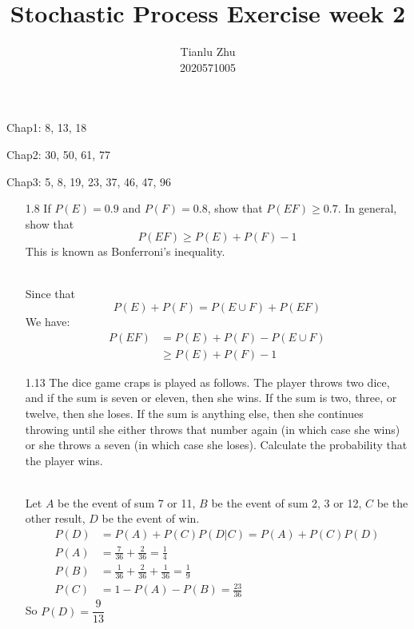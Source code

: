 \documentclass[en,hazy,blue,12pt,device = normal]{elegantnote}
\title{Stochastic Process Exercise week 2}
\author{Tianlu Zhu \\ 2020571005}
\date{}
\begin{document}
\maketitle
Chap1: 8, 13, 18

   Chap2: 30, 50, 61, 77

   Chap3: 5, 8, 19, 23, 37, 46, 47, 96

\begin{enumerate}
    \item[1.8] If $P(E)=0.9$ and $P(F)=0.8$, show that $P(E F) \geq 0.7$. In general, show that
    $$
    P(E F) \geq P(E)+P(F)-1
    $$
    This is known as Bonferroni's inequality.
    \begin{tcolorbox}
        \sol\\
        Since that \[P(E) + P(F) = P(E\cup F) + P(EF)\]
        We have:
        \begin{align*}
            P(EF)&=P(E) + P(F) - P(E\cup F)\\
            &\geq P(E) + P(F) - 1
        \end{align*}
    \end{tcolorbox}

    \item[1.13] The dice game craps is played as follows. The player throws two dice, and if the sum is seven or eleven, then she wins. If the sum is two, three, or twelve, then she loses. If the sum is anything else, then she continues throwing until she either throws that number again (in which case she wins) or she throws a seven (in which case she loses). Calculate the probability that the player wins.
    \begin{tcolorbox}
        \sol \\
        
        Let \(A\) be the event of sum 7 or 11, \(B\) be the event of sum 2, 3 or 12, \(C\) be the other result, \(D\) be the event of win.
        \begin{align*}
            P(D) &= P(A) + P(C) P(D|C) = P(A) + P(C)P(D)\\
            P(A) &= \frac{7}{36} + \frac{2}{36} = \frac{1}{4}\\
            P(B) &= \frac{1}{36} + \frac{2}{36} + \frac{1}{36} = \frac{1}{9}\\
            P(C) &= 1-P(A)-P(B) = \frac{23}{36}
        \end{align*}
        So \(P(D) = \dfrac{9}{13}\)




\end{tcolorbox}
\end{enumerate}
\end{document}
